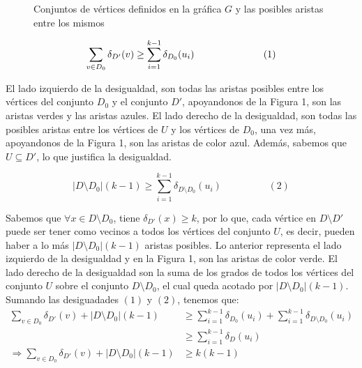 \documentclass{article}
\begin{document}
\begin{figure}
\begin{center}
\begin{tikzpicture}[scale=1.2]
    
    
    
\end{tikzpicture}
\end{center}

\caption{Conjuntos de vértices definidos en la gráfica $G$ y las posibles aristas entre los mismos}
    \label{fig:grafica_1}
\end{figure}


$$\sum_{v\in D_0}\delta_{D'}(v)\geq \sum_{i=1}^{k-1}\delta_{D_0}(u_i) \hspace{2.5cm} (1)$$

El lado izquierdo de la desigualdad, son todas las aristas posibles entre los vértices del conjunto $D_0$ y el conjunto $D'$, apoyandonos de la Figura 1, son las aristas verdes y las aristas azules. El lado derecho de la desigualdad, son todas las posibles aristas entre los vértices de $U$ y los vértices de $D_0$, una vez más, apoyandonos de la Figura 1, son las aristas de color azul. Además, sabemos que $U\subseteq D'$, lo que justifica la desigualdad.

$$|D\setminus D_0|(k-1)\geq \sum_{i=1}^{k-1}\delta_{D\setminus D_0}(u_i) \hspace{2cm} (2)$$


Sabemos que $\forall x \in D\setminus D_0$, tiene $\delta_{D'}(x)\geq k$, por lo que, cada vértice en $D\setminus D'$ puede ser tener como vecinos a todos los vértices del conjunto $U$, es decir, pueden haber a lo más $|D\setminus D_0|(k-1)$ aristas posibles. Lo anterior representa el lado izquierdo de la desigualdad y en la Figura 1, son las aristas de color verde. El lado derecho de la desigualdad son la suma de los grados de todos los vértices del conjunto $U$ sobre el conjunto $D\setminus D_0$, el cual queda acotado por $|D\setminus D_0|(k-1)$.\\

Sumando las desiguadades $(1)$ y $(2)$, tenemos que:\\

\begin{align*}
\sum_{v\in D_0}\delta_{D'}(v)+|D\setminus D_0|(k-1)&\geq \sum_{i=1}^{k-1}\delta_{D_0}(u_i)+\sum_{i=1}^{k-1}\delta_{D\setminus D_0}(u_i)\\
& \geq \sum_{i=1}^{k-1}\delta_{D}(u_i)\\
\Longrightarrow \sum_{v\in D_0}\delta_{D'}(v)+|D\setminus D_0|(k-1)&\geq k(k-1)\\
\end{align*}
\end{document}
